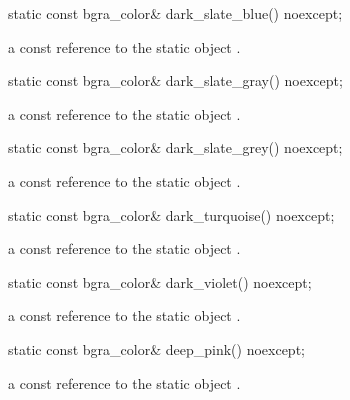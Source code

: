 \begin{itemdecl}
static const bgra_color& dark_slate_blue() noexcept;
\end{itemdecl}
\begin{itemdescr}
\pnum
\returns
a const reference to the static  object .
\end{itemdescr}

\begin{itemdecl}
static const bgra_color& dark_slate_gray() noexcept;
\end{itemdecl}
\begin{itemdescr}
\pnum
\returns
a const reference to the static  object .
\end{itemdescr}

\begin{itemdecl}
static const bgra_color& dark_slate_grey() noexcept;
\end{itemdecl}
\begin{itemdescr}
\pnum
\returns
a const reference to the static  object .
\end{itemdescr}

\begin{itemdecl}
static const bgra_color& dark_turquoise() noexcept;
\end{itemdecl}
\begin{itemdescr}
\pnum
\returns
a const reference to the static  object .
\end{itemdescr}

\begin{itemdecl}
static const bgra_color& dark_violet() noexcept;
\end{itemdecl}
\begin{itemdescr}
\pnum
\returns
a const reference to the static  object .
\end{itemdescr}

\begin{itemdecl}
static const bgra_color& deep_pink() noexcept;
\end{itemdecl}
\begin{itemdescr}
\pnum
\returns
a const reference to the static  object .
\end{itemdescr}

